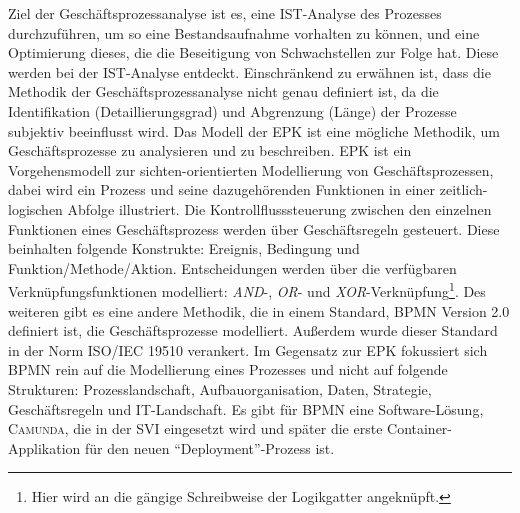 Ziel der Geschäftsprozessanalyse ist es, eine IST-Analyse des Prozesses durchzuführen, um so eine Bestandsaufnahme vorhalten zu können, und eine Optimierung dieses, die die Beseitigung von Schwachstellen zur Folge hat. Diese werden bei der IST-Analyse entdeckt. Einschränkend zu erwähnen ist, dass die Methodik der Geschäftsprozessanalyse nicht genau definiert ist, da die Identifikation (Detaillierungsgrad) und Abgrenzung (Länge) der Prozesse subjektiv beeinflusst wird. Das Modell der \ac{EPK} ist eine mögliche Methodik, um Geschäftsprozesse zu analysieren und zu beschreiben.\autocite[vgl.][S.59]{staud_geschaftsprozessanalyse_2006} \ac{EPK} ist ein Vorgehensmodell zur sichten-orientierten Modellierung von Geschäftsprozessen, dabei wird ein Prozess und seine dazugehörenden Funktionen in einer zeitlich-logischen Abfolge illustriert.\autocite[vgl.][S.4]{scheer_objektorientierte_1997} Die Kontrollflusssteuerung zwischen den einzelnen Funktionen eines Geschäftsprozess werden über Geschäftsregeln gesteuert. Diese beinhalten folgende Konstrukte: Ereignis, Bedingung und Funktion/Methode/Aktion. Entscheidungen werden über die verfügbaren Verknüpfungsfunktionen modelliert:\autocite[vgl.][S.4]{scheer_objektorientierte_1997} \textit{AND}-, \textit{OR}- und \textit{XOR}-Verknüpfung\footnote{Hier wird an die gängige Schreibweise der Logikgatter angeknüpft.}. Des weiteren gibt es eine andere Methodik, die in einem Standard, \ac{BPMN} Version 2.0 \autocite{object_management_group_omg_business_2011} definiert ist, die Geschäftsprozesse modelliert. Außerdem wurde dieser Standard in der Norm ISO/IEC 19510 verankert.\autocite{ict1_information_2020} Im Gegensatz zur \ac{EPK} fokussiert sich \ac{BPMN} rein auf die Modellierung eines Prozesses und nicht auf folgende Strukturen: Prozesslandschaft, Aufbauorganisation, Daten, Strategie, Geschäftsregeln und IT-Landschaft.\autocite[vgl.][S.28]{freund_praxishandbuch_2017} Es gibt für \ac{BPMN} eine Software-Lösung, \textsc{Camunda}, die in der \ac{SVI} eingesetzt wird und später die erste Container-Applikation für den neuen \enquote{Deployment}-Prozess ist.


